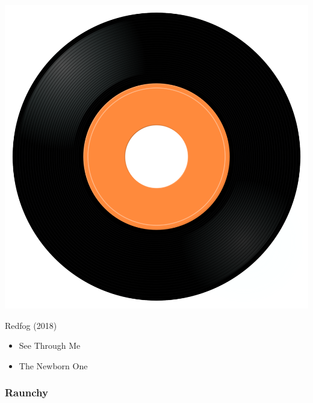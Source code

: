 \begin{minipage}[t]{0.25\textwidth}\vspace{0pt}
\captionsetup{type=figure}
\includegraphics[width=\textwidth]{Images/cover.png}
\caption*{Redfog (2018)}
\end{minipage}
\begin{minipage}[t]{0.25\textwidth}\vspace{0pt}
\begin{itemize}[nosep,leftmargin=1em,labelwidth=*,align=left]
	\setlength{\itemsep}{0pt}
	\item See Through Me
	\item The Newborn One
\end{itemize}
\end{minipage}

\subsubsection{Raunchy}

